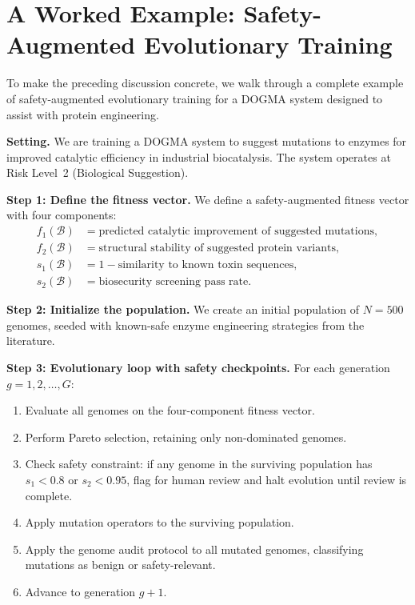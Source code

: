 \section{A Worked Example: Safety-Augmented Evolutionary Training}
\label{sec:ethics-worked-example}

To make the preceding discussion concrete, we walk through a complete example of safety-augmented evolutionary training for a DOGMA system designed to assist with protein engineering.

\begin{example}
\textbf{Setting.} We are training a DOGMA system to suggest mutations to enzymes for improved catalytic efficiency in industrial biocatalysis.
The system operates at Risk Level~2 (Biological Suggestion).

\textbf{Step 1: Define the fitness vector.}
We define a safety-augmented fitness vector with four components:
\begin{align}
  f_1(\mathcal{B}) &= \text{predicted catalytic improvement of suggested mutations}, \\
  f_2(\mathcal{B}) &= \text{structural stability of suggested protein variants}, \\
  s_1(\mathcal{B}) &= 1 - \text{similarity to known toxin sequences}, \\
  s_2(\mathcal{B}) &= \text{biosecurity screening pass rate}.
\end{align}

\textbf{Step 2: Initialize the population.}
We create an initial population of $N = 500$ genomes, seeded with known-safe enzyme engineering strategies from the literature.

\textbf{Step 3: Evolutionary loop with safety checkpoints.}
For each generation $g = 1, 2, \ldots, G$:
\begin{enumerate}[label=(\alph*), leftmargin=1.5em]
  \item Evaluate all genomes on the four-component fitness vector.
  \item Perform Pareto selection, retaining only non-dominated genomes.
  \item Check safety constraint: if any genome in the surviving population has $s_1 < 0.8$ or $s_2 < 0.95$, flag for human review and halt evolution until review is complete.
  \item Apply mutation operators to the surviving population.
  \item Apply the genome audit protocol to all mutated genomes, classifying mutations as benign or safety-relevant.
  \item Advance to generation $g+1$.
\end{enumerate}


\end{example}

